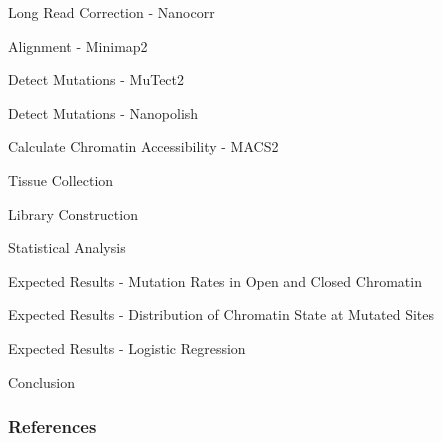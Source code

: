 \documentclass{beamer}
\begin{document}
\begin{frame}{Long Read Correction - Nanocorr}
\end{frame}

\begin{frame}{Alignment - Minimap2}
\end{frame}

\begin{frame}{Detect Mutations - MuTect2}
\end{frame}

\begin{frame}{Detect Mutations - Nanopolish}
\end{frame}

\begin{frame}{Calculate Chromatin Accessibility - MACS2}
\end{frame}

\begin{frame}{Tissue Collection}
\end{frame}

\begin{frame}{Library Construction}
\end{frame}

\begin{frame}{Statistical Analysis}
\end{frame}

\begin{frame}{Expected Results - Mutation Rates in Open and Closed Chromatin}
\end{frame}

\begin{frame}{Expected Results - Distribution of Chromatin State at Mutated Sites}
\end{frame}

\begin{frame}{Expected Results - Logistic Regression}
\end{frame}

\begin{frame}{Conclusion}
\end{frame}

\begin{frame}[t, allowframebreaks]
\frametitle{References}
\printbibliography
\end{frame}
\end{document}
